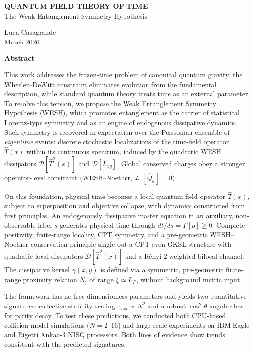 \documentclass[12pt,a4paper]{article}
\numberwithin{equation}{section}
\renewenvironment{abstract}{
  \vspace*{-3cm}  
  \begin{center}
  \Large\textbf{Abstract} 
  \end{center}
  \vspace{0.5cm} 
  \noindent\ignorespaces  
}{\par\vspace{1cm}}
\begin{document}
\begin{titlepage}
{\centering 
\vspace*{2cm}
{\LARGE\bfseries
QUANTUM FIELD THEORY OF TIME\\[0.5cm]
}
\vspace{1cm}
{\Large
The Weak Entanglement Symmetry Hypothesis\\[1cm]
}
\vspace{1cm}

{\large
Luca Casagrande\\[0.5cm]
}
\vfill
{\normalsize
March 2026\\[0.5cm]
}
}
\end{titlepage}

\vspace{0.3cm}
\begin{abstract}
This work addresses the frozen-time problem of canonical quantum gravity: the Wheeler--DeWitt constraint eliminates evolution from the fundamental description, while standard quantum theory treats time as an external parameter. To resolve this tension, we propose the Weak Entanglement Symmetry Hypothesis (WESH), which promotes entanglement as the carrier of statistical Lorentz-type symmetry and as an engine of endogenous dissipative dynamics. Such symmetry is recovered in expectation over the Poissonian ensemble of \emph{eigentime} events: discrete stochastic localizations of the time-field operator $\hat{T}(x)$ within its continuous spectrum, induced by the quadratic WESH dissipators $\mathcal{D}[\hat{T}^2(x)]$ and $\mathcal{D}[L_{xy}]$. Global conserved charges obey a stronger operator-level constraint (WESH--Noether, $\mathcal{L}^\dagger[\hat{Q}_a]=0$).

On this foundation, physical time becomes a local quantum field operator $\hat T(x)$, subject to superposition and objective collapse, with dynamics constructed from first principles. An endogenously dissipative master equation in an auxiliary, non-observable label $s$ generates physical time through $dt/ds=\Gamma[\rho]\ge 0$. Complete positivity, finite-range locality, CPT symmetry, and a pre-geometric WESH--Noether conservation principle single out a CPT-even GKSL structure with quadratic local dissipators $\mathcal D[\hat T^2(x)]$ and a R\'enyi-2 weighted bilocal channel. The dissipative kernel $\gamma(x,y)$ is defined via a symmetric, pre-geometric finite-range proximity relation $N_\xi$ of range $\xi\simeq L_P$, without background metric input.

The framework has no free dimensionless parameters and yields two quantitative signatures: collective stability scaling $\tau_{\mathrm{coh}}\propto N^2$ and a robust $\cos^2\theta$ angular law for parity decay. To test these predictions, we conducted both CPU-based collision-model simulations ($N=2$--$16$) and large-scale experiments on IBM Eagle and Rigetti Ankaa-3 NISQ processors. Both lines of evidence show trends consistent with the predicted signatures.
\end{abstract}
\end{document}
